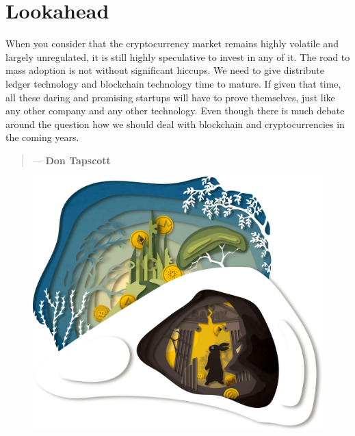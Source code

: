 \chapter{Lookahead}
\label{ch:epilogue}


 When you consider that the cryptocurrency market remains highly volatile and largely unregulated, it is still highly speculative to invest in any of it. The road to mass adoption is not without significant hiccups. We need to give distribute ledger technology and blockchain technology time to mature. If given that time, all these daring and promising startups will have to prove themselves, just like any other company and any other technology. Even though there is much debate around the question how we should deal with blockchain and cryptocurrencies in the coming years.

       \bigskip 
       \begin{quotation}
              \textit{}
              \begin{flushright}
                \small{--- \textbf{Don Tapscott}}
              \end{flushright}
        \end{quotation}   
  

\begin{figure}
\centering
    \includegraphics[width=\textwidth]{illustrations/resized_CRYPTO_KEY_1_PART_2.jpg}
\end{figure}

